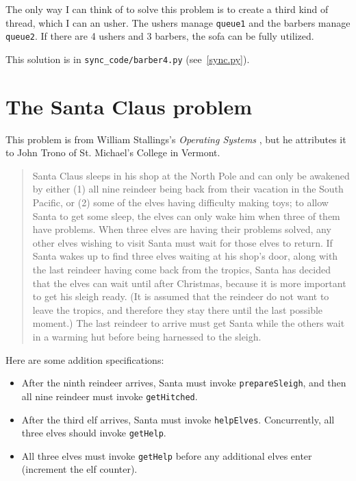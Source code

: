 \documentclass{book}
\newcommand{\clearemptydoublepage}{\newpage\cleardoublepage}
\begin{document}
The only way I can think of to solve this problem is to create a third
kind of thread, which I can an usher.  The ushers manage {\tt queue1}
and the barbers manage {\tt queue2}.  If there are 4 ushers and 3 barbers,
the sofa can be fully utilized.

This solution is in \verb"sync_code/barber4.py" (see~\ref{sync.py}).


\clearemptydoublepage
\section{The Santa Claus problem}

This problem is from William Stallings's
{\em Operating Systems} \cite{stallings},
but he attributes it to John Trono of St. Michael's College in
Vermont.

\begin{quotation}
Santa Claus sleeps in his shop at the North Pole and can only be
awakened by either (1) all nine reindeer being back from their
vacation in the South Pacific, or (2) some of the elves having
difficulty making toys; to allow Santa to get some sleep, the elves
can only wake him when three of them have problems.  When three elves
are having their problems solved, any other elves wishing to visit
Santa must wait for those elves to return.  If Santa wakes up to find
three elves waiting at his shop's door, along with the last reindeer
having come back from the tropics, Santa has decided that the elves can
wait until after Christmas, because it is more important to get his
sleigh ready.  (It is assumed that the reindeer do not want to leave
the tropics, and therefore they stay there until the last possible
moment.)  The last reindeer to arrive must get Santa while the others
wait in a warming hut before being harnessed to the sleigh.
\end{quotation}

Here are some addition specifications:

\begin {itemize}

\item After the ninth reindeer arrives, Santa must invoke 
{\tt prepareSleigh}, and then all nine reindeer must
invoke {\tt getHitched}.

\item After the third elf arrives, Santa must invoke {\tt helpElves}.
Concurrently, all three elves should invoke {\tt getHelp}.

\item All three elves must invoke {\tt getHelp} before any additional
elves enter (increment the elf counter).

\end {itemize}
\end{document}
